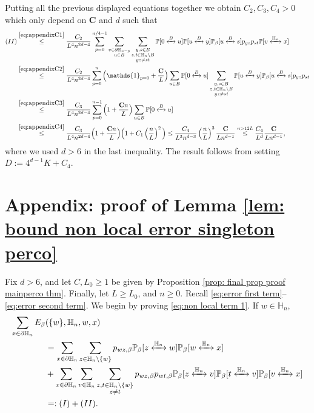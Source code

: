 \documentclass[11pt,a4paper]{article}
\numberwithin{equation}{section}
\theoremstyle{plain}
\theoremstyle{definition}
\newcommand\bfC{\mathbf{C}}
\newcommand{\connect}{\xleftrightarrow}
\begin{document}
Putting all the previous displayed equations together we obtain $C_2,C_3,C_4>0$ which only depend on $\bfC$ and $d$ such that
\begin{align*}
	(II)&\stackrel{\eqref{eq:appendixC1}}\leq \frac{C_2}{L^4n^{2d-4}}\sum_{p=0}^{n/4-1}\sum_{\substack{v\in \partial \mathbb H_{n-p}\\u\in B}}\sum_{\substack{y,s\in B\\ z,t\in \mathbb H_n \setminus B\\ yz\neq st}}\mathbb P[0\connect{B\:}u]\mathbb P[u\connect{B\:}y]\mathbb P_\beta[u\connect{B\:}s]p_{yz}p_{st}\mathbb P[v\connect{\mathbb H_n\:}x]
	\\&\stackrel{\eqref{eq:appendixC2}}\leq \frac{C_2}{L^4n^{2d-4}}\sum_{p=0}^{n}\Big(\mathds{1}_{p=0}+\frac{\bfC}{L}\Big)\sum_{u\in B}\mathbb P[0\connect{B\:}u] \sum_{\substack{y,s\in B\\ z,t\in \mathbb H_n \setminus B\\ yz\neq st}}\mathbb P[u\connect{B\:}y]\mathbb P_\beta[u\connect{B\:}s]p_{yz}p_{st}
	\\&\stackrel{\eqref{eq:appendixC3}}\leq \frac{C_3}{L^4n^{2d-4}}\sum_{p=0}^{n-1}\Big(1+\frac{\bfC n}{L}\Big)\sum_{u\in B}\mathbb P[0\connect{B\:}u]
	\\&\stackrel{\eqref{eq:appendixC4}}\leq \frac{C_3}{L^4n^{2d-4}}\Big(1+\frac{ \bfC n}{L}\Big)\Big(1+C_1\left(\frac{n}{L}\right)^2\Big) \leq \frac{C_4}{L^3n^{d-3}}\left(\frac{n}{L}\right)^3\frac{\bfC}{Ln^{d-1}}\stackrel{n>12L}\leq \frac{C_4}{L^d}\frac{\bfC}{Ln^{d-1}},
	\end{align*}
where we used $d>6$ in the last inequality.
The result follows from setting $D:=4^{d-1}K+C_4$.


\section{Appendix: proof of Lemma \ref{lem: bound non local error singleton perco}}\label{appendix:boundEaverage}


Fix $d>6$, and let $C,L_0\geq 1$ be given by Proposition \ref{prop: final prop proof mainperco thm}. Finally, let $L\geq L_0$, and $n\geq 0$. Recall \eqref{eq:error first term}--\eqref{eq:error second term}. We begin by proving \eqref{eq:non local term 1}. If $w\in \mathbb H_n$,
\begin{align*}
	\sum_{x\in \partial \mathbb H_n}{E}_\beta&(\{w\},\mathbb H_n,w,x)\\
	&=\sum_{x\in \partial \mathbb H_n}\sum_{z\in \mathbb H_n\setminus \{ w\}}p_{wz,\beta}\mathbb P_\beta[z\connect{\mathbb H_n\:}w]\mathbb P_\beta[w\connect{\mathbb H_n\:}x]
	\\&+\sum_{x\in \partial \mathbb H_n}\sum_{v\in \mathbb H_n}\sum_{\substack{z,t\in \mathbb H_n\setminus \{w\}\\z\neq t}}p_{wz,\beta}p_{wt,\beta}\mathbb P_\beta[z\connect{\mathbb H_n\:}v]\mathbb P_\beta[t\connect{\mathbb H_n\:}v]\mathbb P_\beta[v\connect{\mathbb H_n\:}x]
	\\&=:(I)+(II).
\end{align*}
\end{document}
